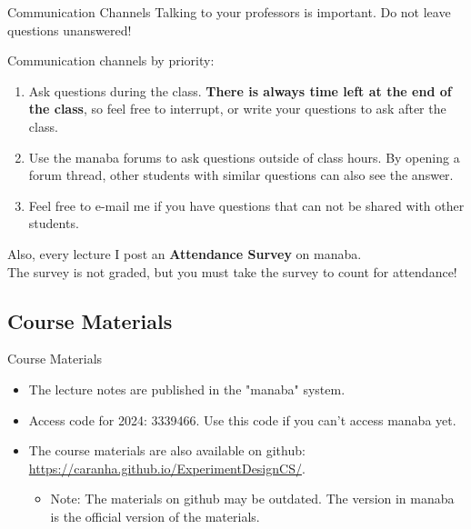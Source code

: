 \documentclass[aspectratio=169]{beamer}
\begin{document}

\begin{frame}[t]{Communication Channels}{}
  Talking to your professors is important. Do not leave questions unanswered!\bigskip

  Communication channels by priority:
  \begin{enumerate}
  \item Ask questions during the class. {\bf There is always time left at the end of the class}, so feel free to interrupt, or write your questions to ask after the class.
  \item Use the manaba forums to ask questions outside of class
    hours. By opening a forum thread, other students with similar
    questions can also see the answer.
  \item Feel free to e-mail me if you have questions that can not be
    shared with other students.
  \end{enumerate}\bigskip

  Also, every lecture I post an {\bf Attendance Survey} on manaba.\\
  The survey is not graded, but \alert{you must take the survey to count
    for attendance!}
\end{frame}

\subsection{Course Materials}
\begin{frame}[t]{Course Materials}
  \begin{itemize}
  \item The lecture notes are published in the "manaba" system.
  \item Access code for 2024: \alert{3339466}. Use this code if you can't access manaba yet.
    \bigskip

  \item The course materials are also available on github:\\
    \url{https://caranha.github.io/ExperimentDesignCS/}.\medskip
    \begin{itemize}
      \item Note: The materials on github may be outdated. The version in manaba is the official version of the materials.
    \end{itemize}

  \end{itemize}
\end{frame}
\end{document}
